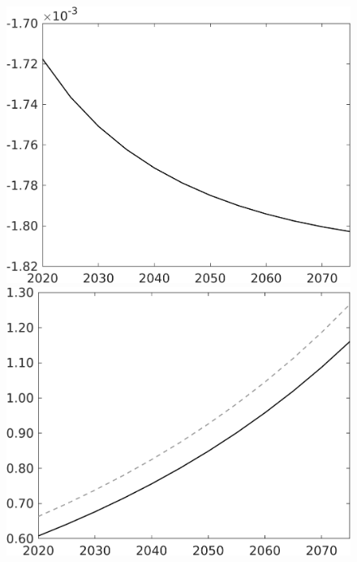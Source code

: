 \documentclass[12pt]{article}
\begin{document}
\begin{figure}[h!!]
\begin{minipage}[]{0.32\textwidth}
	\end{minipage}	
	\begin{minipage}[]{0.32\textwidth}
		\includegraphics[width=1\textwidth]{../../codding_model/own_basedOnFried/optimalPol_010922_revision/figures/all_13Sept22/CompTaul_LFBAUPer_Reg0_EY_spillover0_nsk0_xgr1_knspil0_sep1_countec0_GovRev0_etaa0.79.png}
	\end{minipage}	
	\begin{minipage}[]{0.32\textwidth}
		\includegraphics[width=1\textwidth]{../../codding_model/own_basedOnFried/optimalPol_010922_revision/figures/all_13Sept22/CompTaul_LFBAU_Reg0_N_spillover0_nsk0_xgr1_knspil0_sep1_countec0_GovRev0_etaa0.79_lgd0.png}

\end{minipage}
\end{figure}
\end{document}
